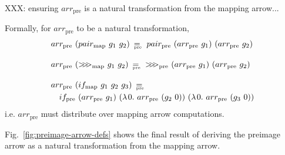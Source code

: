 \documentclass[preprint]{sigplanconf}
\newcommand{\arrowarr}{\ensuremath{arr}}
\newcommand{\arrowcomp}{\ensuremath{{>}\mspace{-6mu}{>}\mspace{-6mu}{>}}}
\newcommand{\arrowpair}{\ensuremath{pair}}
\newcommand{\arrowif}{\ensuremath{if}}
\newcommand{\map}{_\mathrm{map}}
\newcommand{\compmap}{\arrowcomp\map}
\newcommand{\pairmap}{\arrowpair\map}
\newcommand{\ifmap}{\arrowif\map}
\newcommand{\pre}{_\mathrm{pre}}
\DeclareMathOperator{\eqpre}{=_{\mspace{-17mu}\pre}}
\newcommand{\arrpre}{\arrowarr\pre}
\newcommand{\comppre}{\arrowcomp\pre}
\newcommand{\pairpre}{\arrowpair\pre}
\newcommand{\ifpre}{\arrowif\pre}
\begin{document}
XXX: ensuring $\arrpre$ is a natural transformation from the mapping arrow...

Formally, for $\arrpre$ to be a natural transformation,
\begin{align}
	&\begin{aligned}
		\arrpre~(\pairmap~g_1~g_2) \ \eqpre \ \pairpre~(\arrpre~g_1)~(\arrpre~g_2)
	\label{eqn:arrpre-distributes-over-pairmap}
	\end{aligned} \\
\nonumber \\[-6pt]
	&\begin{aligned}
		\arrpre~(\compmap~g_1~g_2) \ \eqpre \ \comppre~(\arrpre~g_1)~(\arrpre~g_2)
	\label{eqn:arrpre-distributes-over-compmap}
	\end{aligned} \\
\nonumber \\[-6pt]
	&\begin{aligned}
		&\arrpre~(\ifmap~g_1~g_2~g_3) \ \eqpre \ \\
		&\tab\ifpre~(\arrpre~g_1)~(\fun{0}{\arrpre~(g_2~0)})~(\fun{0}{\arrpre~(g_3~0)})
	\label{eqn:arrpre-distributes-over-ifmap}
	\end{aligned}
\end{align}
i.e. $\arrpre$ must distribute over mapping arrow computations.

Fig.~\ref{fig:preimage-arrow-defs} shows the final result of deriving the preimage arrow as a natural transformation from the mapping arrow.
\end{document}
